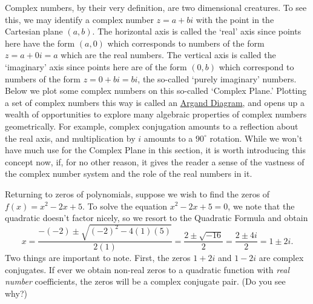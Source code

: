 Complex numbers, by their very definition, are two dimensional creatures.  To see this, we may identify a complex number $z = a+bi$ with the point in the Cartesian plane $(a,b)$. The horizontal axis is called the `real' axis since points here have the form $(a,0)$ which corresponds to numbers of the form $z = a + 0i = a$ which are the real numbers. The vertical axis is called the `imaginary' axis since points here are of the form $(0,b)$ which correspond to numbers of the form $z = 0+bi = bi$,  the so-called `purely imaginary' numbers.  Below we plot some complex numbers on this so-called  `Complex Plane.'  Plotting a set of complex numbers this way is called an \href{https://en.wikipedia.org/wiki/Complex_plane}{Argand Diagram}, and opens up a wealth of opportunities to explore many algebraic properties of complex numbers geometrically. For example, complex conjugation amounts to a reflection about the real axis, and multiplication by $i$ amounts to a $90^{\circ}$ rotation. While we won't have much use for the Complex Plane in this section, it is worth introducing this concept now, if, for no other reason, it gives the reader a sense of the vastness of the complex number system and the role of the real numbers in it.


Returning to zeros of polynomials, suppose we wish to find the zeros of $f(x) = x^2-2x+5$.  To solve the equation $x^2-2x+5 = 0$, we note that the quadratic doesn't factor nicely, so we resort to the Quadratic Formula %
and obtain \[ x = \dfrac{-(-2) \pm \sqrt{(-2)^2-4(1)(5)}}{2(1)} = \dfrac{2 \pm \sqrt{-16}}{2} = \dfrac{2 \pm 4i}{2} = 1 \pm 2i.\] Two things are important to note.  First, the zeros $1+2i$ and $1-2i$ are complex conjugates.  If ever we obtain non-real zeros to a quadratic function with \textit{real number} coefficients, the zeros  will be a complex conjugate pair. (Do you see why?)  

